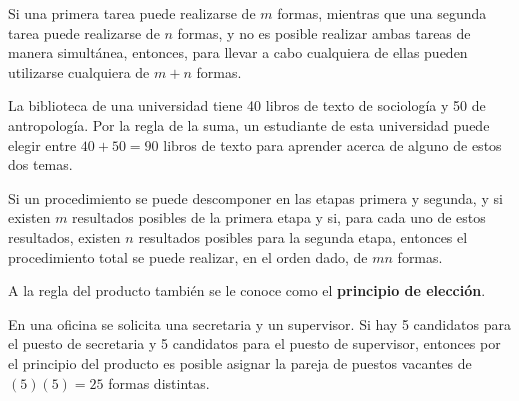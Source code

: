 \begin{tcolorbox}[
      theorem style=change break,
      enhanced,
      breakable,
      boxrule=0pt,
      frame hidden,
      borderline west={3pt}{0pt}{jblueleft},
      colback=jblueinner,
      coltitle=jblueleft,
      attach title to upper={\ },
      sharp corners,
      title={Regla de la suma:},
      fonttitle=\bfseries,
      fontupper=\normalsize
]
    Si una primera tarea puede realizarse de $m$ formas, mientras que una segunda tarea puede realizarse de $n$ formas, y no es posible realizar ambas tareas de manera simultánea, entonces, para llevar a cabo cualquiera de ellas pueden utilizarse cualquiera de $m + n$ formas.
\end{tcolorbox}

\begin{myexample}
    La biblioteca de una universidad tiene 40 libros de texto de sociología y 50 de antropología. Por la regla de la suma, un estudiante de esta universidad puede elegir entre $40 + 50 = 90$ libros de texto para aprender acerca de alguno de estos dos temas.
\end{myexample}

\newpage 

\begin{tcolorbox}[
      theorem style=change break,
      enhanced,
      breakable,
      boxrule=0pt,
      frame hidden,
      borderline west={3pt}{0pt}{jblueleft},
      colback=jblueinner,
      coltitle=jblueleft,
      attach title to upper={\ },
      sharp corners,
      title={Regla del producto:},
      fonttitle=\bfseries,
      fontupper=\normalsize
]
    Si un procedimiento se puede descomponer en las etapas primera y segunda, y si existen $m$ resultados posibles de la primera etapa y si, para cada uno de estos resultados, existen $n$ resultados posibles para la segunda etapa, entonces el procedimiento total se puede realizar, en el orden dado, de $mn$ formas.
\end{tcolorbox}

\begin{importante}{}{}
    A la regla del producto también se le conoce como el \textbf{principio de elección}.
\end{importante}

\begin{myexample}
    En una oficina se solicita una secretaria y un supervisor. Si hay 5 candidatos para el puesto de secretaria y 5 candidatos para el puesto de supervisor, entonces por el principio del producto es posible asignar la pareja de puestos vacantes de $(5)(5) = 25$ formas distintas.
\end{myexample}

